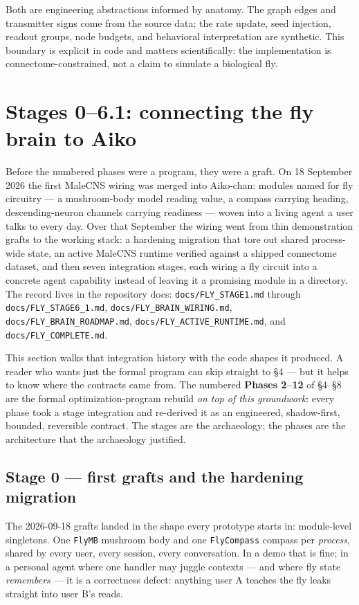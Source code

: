 \documentclass[11pt]{article}
\begin{document}
Both are engineering abstractions informed by anatomy. The graph edges and transmitter signs come from the source data; the rate update, seed injection, readout groups, node budgets, and behavioral interpretation are synthetic. This boundary is explicit in code and matters scientifically: the implementation is connectome-constrained, not a claim to simulate a biological fly.

\section{Stages 0–6.1: connecting the fly brain to Aiko}

Before the numbered phases were a program, they were a graft. On 18 September 2026 the first MaleCNS wiring was merged into Aiko-chan: modules named for fly circuitry — a mushroom-body model reading value, a compass carrying heading, descending-neuron channels carrying readiness — woven into a living agent a user talks to every day. Over that September the wiring went from thin demonstration grafts to the working stack: a hardening migration that tore out shared process-wide state, an active MaleCNS runtime verified against a shipped connectome dataset, and then seven integration stages, each wiring a fly circuit into a concrete agent capability instead of leaving it a promising module in a directory. The record lives in the repository docs: \texttt{docs/FLY\_STAGE1.md} through \texttt{docs/FLY\_STAGE6\_1.md}, \texttt{docs/FLY\_BRAIN\_WIRING.md}, \texttt{docs/FLY\_BRAIN\_ROADMAP.md}, \texttt{docs/FLY\_ACTIVE\_RUNTIME.md}, and \texttt{docs/FLY\_COMPLETE.md}.

This section walks that integration history with the code shapes it produced. A reader who wants just the formal program can skip straight to §4 — but it helps to know where the contracts came from. The numbered \textbf{Phases 2–12} of §4–§8 are the formal optimization-program rebuild \emph{on top of this groundwork}: every phase took a stage integration and re-derived it as an engineered, shadow-first, bounded, reversible contract. The stages are the archaeology; the phases are the architecture that the archaeology justified.

\subsection{Stage 0 — first grafts and the hardening migration}

The 2026-09-18 grafts landed in the shape every prototype starts in: module-level singletons. One \texttt{FlyMB} mushroom body and one \texttt{FlyCompass} compass per \emph{process}, shared by every user, every session, every conversation. In a demo that is fine; in a personal agent where one handler may juggle contexts — and where fly state \emph{remembers} — it is a correctness defect: anything user A teaches the fly leaks straight into user B's reads.
\end{document}

